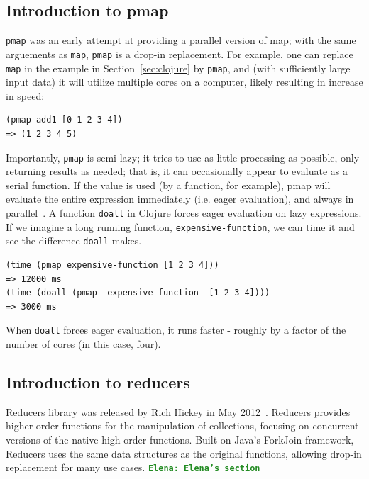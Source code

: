 \documentclass[12pt]{article}
\newcommand{\comment}[1]{{\bf \tt  {#1}}}
\newcommand{\emcomment}[1]{\textcolor{ForestGreen}{\comment{Elena: {#1}}}}
\newcommand{\clocode}[1]{{\texttt {#1}}}
\begin{document}
\subsection{Introduction to pmap}\label{sec:pmap}
\clocode{pmap} was an early attempt at providing a parallel version of map; with the same arguements as \clocode{map}, \clocode{pmap} is a drop-in replacement. For example, one can replace \clocode{map} in the example in Section~\ref{sec:clojure} by \clocode{pmap}, and (with sufficiently large input data) it will utilize multiple cores on a computer, likely resulting in increase in speed:   
\begin{verbatim}
(pmap add1 [0 1 2 3 4])
=> (1 2 3 4 5)
\end{verbatim}
Importantly, \clocode{pmap} is semi-lazy; it tries to use as little processing as possible, only returning results as needed; that is, it can occasionally appear to evaluate as a serial function. %
If the value is used (by a function, for example), pmap will evaluate the entire expression immediately (i.e. eager evaluation), and always %
 in parallel~\cite{Pmap}. A function \clocode{doall} in Clojure forces eager evaluation on lazy expressions. 
If we imagine a long running function, \clocode{expensive-function}, we can time it and see the difference \clocode{doall} makes.
\begin{verbatim}
(time (pmap expensive-function [1 2 3 4]))
=> 12000 ms 
(time (doall (pmap  expensive-function  [1 2 3 4])))
=> 3000 ms
\end{verbatim}
When \clocode{doall} forces eager evaluation, it runs faster - roughly by a factor of the number of cores (in this case, four).


\subsection{Introduction to reducers}\label{sec:reducers}
Reducers library was released by Rich Hickey in May 2012~\cite{HickeyReducers}. Reducers provides higher-order functions for the manipulation of collections, focusing on concurrent versions of the native high-order functions.  Built on Java's ForkJoin framework, Reducers uses the same data structures as the original functions, allowing drop-in replacement for many use cases.
\emcomment{Elena's section}
\end{document}
